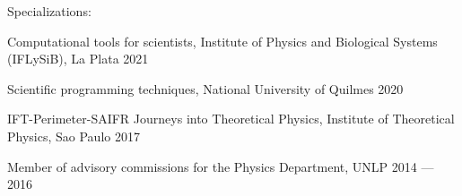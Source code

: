 Specializations:
\begin{zitemize}\vspace{-0.2 cm}


\item[\empty] Computational tools for scientists, Institute of Physics and Biological Systems (IFLySiB), La Plata \hfill 2021

\item[\empty] Scientific programming techniques, National University of Quilmes \hfill 2020


\item[\empty] IFT-Perimeter-SAIFR Journeys into Theoretical Physics, Institute of Theoretical Physics, Sao Paulo \hfill 2017
\end{zitemize}

Member of advisory commissions for the Physics Department, UNLP \hspace{7.2 cm} 2014 --- 2016 
